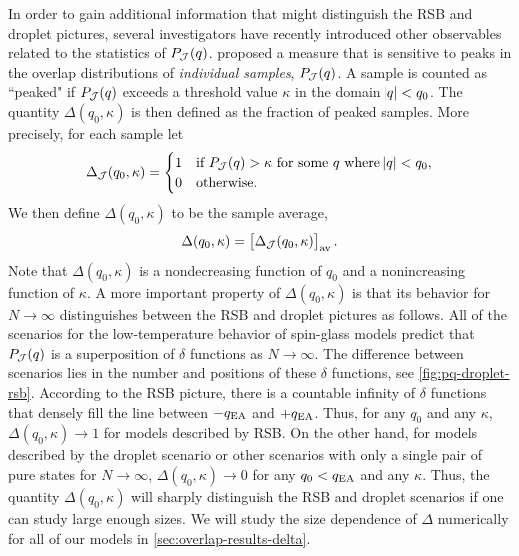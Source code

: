 In order to gain additional information that might distinguish the RSB and
droplet pictures, several investigators have recently introduced other
observables related to the statistics of $P_{\mathcal{J}}(q)$.
\textcite{yucesoy2012evidence} proposed a measure that is sensitive to peaks in
the overlap distributions of \emph{individual samples}, $P_{\mathcal{J}}(q)$. A
sample is counted as ``peaked" if $P_{\mathcal{J}}(q)$ exceeds a threshold value
$\kappa$ in the domain $\abs{q} < q_0$. The quantity $\Delta(q_0,\kappa)$ is
then defined as the fraction of peaked samples. More precisely, for each sample
let
\begin{equation}
  \Delta_{\mathcal{J}}(q_0,\kappa) =
  \begin{cases}
    1 & \text{if $P_{\mathcal{J}}(q)>\kappa$ for some $q$ where $\abs{q}<q_0$}, \\
    0 & \text{otherwise.}
  \end{cases}
  \label{eq:delta-sample}
\end{equation}
We then define $\Delta(q_0,\kappa)$ to be the sample average,
\begin{equation}
  \Delta(q_0,\kappa) = \left[\Delta_{\mathcal{J}}(q_0,\kappa)\right]_{\mathrm{av}}.
  \label{eq:delta-average}
\end{equation}
Note that $\Delta(q_0,\kappa)$ is a nondecreasing function of $q_0$ and a
nonincreasing function of $\kappa$. A more important property of
$\Delta(q_0,\kappa)$ is that its behavior for $N \to \infty$ distinguishes
between the RSB and droplet pictures as follows. All of the scenarios for the
low-temperature behavior of spin-glass models predict that $P_{\mathcal{J}}(q)$ is a
superposition of $\delta$ functions as $N \to \infty$. The difference between
scenarios lies in the number and positions of these $\delta$ functions, see
\cref{fig:pq-droplet-rsb}. According to the RSB picture, there is a countable
infinity of $\delta$ functions that densely fill the line between $-q_{\mathrm{EA}}$ and
$+q_{\mathrm{EA}}$. Thus, for any $q_0$ and any $\kappa$, $\Delta(q_0,\kappa) \to 1$ for
models described by RSB. On the other hand, for models described by the droplet
scenario or other scenarios with only a single pair of pure states for $N \to
\infty$, $\Delta(q_0,\kappa) \to 0$ for any $q_0<q_{\mathrm{EA}}$ and any $\kappa$. Thus,
the quantity $\Delta(q_0,\kappa)$ will sharply distinguish the RSB and droplet
scenarios if one can study large enough sizes. We will study the size
dependence of $\Delta$ numerically for all of our models in
\cref{sec:overlap-results-delta}.
